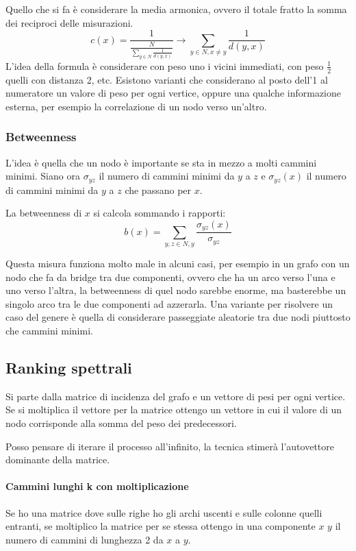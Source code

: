 Quello che si fa è considerare la media armonica, ovvero il totale fratto la 
somma dei reciproci delle misurazioni.
$$c(x) = \frac{1}{\frac{N}{\sum_{y \in N} \frac{1}{d(y, x)}}} \rightarrow \sum_{y \in N, x \neq y} \frac{1}{d(y, x)}$$
L'idea della formula è considerare con peso uno i vicini immediati, con peso 
$\frac{1}{2}$ quelli con distanza 2, etc.
Esistono varianti che considerano al posto dell'1 al numeratore un valore di 
peso per ogni vertice, oppure una qualche informazione esterna, per esempio 
la correlazione di un nodo verso un'altro.

\subsubsection{Betweenness}
L'idea è quella che un nodo è importante se sta in mezzo a molti cammini minimi.
Siano ora $\sigma_{yz}$ il numero di cammini minimi da $y$ a $z$ e $\sigma_{yz}(x)$ 
il numero di cammini minimi da $y$ a $z$ che passano per $x$.

La betweenness di $x$ si calcola sommando i rapporti: 
$$b(x) = \sum_{y, z \in N, y } \frac{\sigma_{yz}(x)}{\sigma_{yz}}$$

Questa misura funziona molto male in alcuni casi, per esempio in un grafo con un nodo 
che fa da bridge tra due componenti, ovvero che ha un arco verso l'una e uno verso 
l'altra, la betweenness di quel nodo sarebbe enorme, ma basterebbe un singolo arco 
tra le due componenti ad azzerarla. 
Una variante per risolvere un caso del genere è quella di considerare passeggiate 
aleatorie tra due nodi piuttosto che cammini minimi.

\subsection{Ranking spettrali}

Si parte dalla matrice di incidenza del grafo e un vettore di pesi per ogni vertice. 
Se si moltiplica il vettore per la matrice ottengo un vettore in cui il valore 
di un nodo corrisponde alla somma del peso dei predecessori.

Posso pensare di iterare il processo all'infinito, la tecnica stimerà l'autovettore 
dominante della matrice.

\paragraph{Cammini lunghi k con moltiplicazione}
Se ho una matrice dove sulle righe ho gli archi uscenti e sulle colonne quelli entranti, 
se moltiplico la matrice per se stessa ottengo in una componente $x$ $y$
il numero di cammini di lunghezza 2 da $x$ a $y$. 

